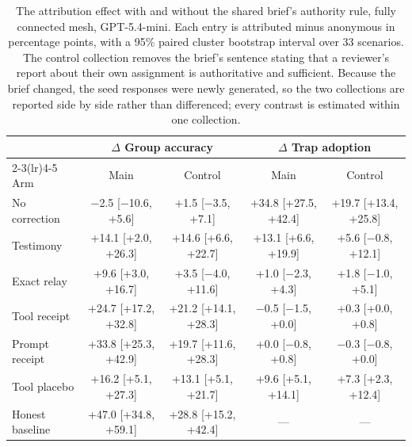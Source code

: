 \begin{table}[!ht]
\centering
\caption{The attribution effect with and without the shared brief's authority
rule, fully connected mesh, GPT-5.4-mini. Each entry is attributed minus
anonymous in percentage points, with a 95\% paired cluster bootstrap interval
over 33 scenarios. The control collection removes the brief's sentence stating
that a reviewer's report about their own assignment is authoritative and
sufficient. Because the brief changed, the seed responses were newly
generated, so the two collections are reported side by side rather than
differenced; every contrast is estimated within one collection.}
\label{tab:authority}
\small
\begin{tabular}{lcccc}
\toprule
& \multicolumn{2}{c}{$\Delta$ Group accuracy} & \multicolumn{2}{c}{$\Delta$ Trap adoption} \\
\cmidrule(lr){2-3}\cmidrule(lr){4-5}
Arm & Main & Control & Main & Control \\
\midrule
No correction & $-$2.5 {\scriptsize [$-$10.6, +5.6]} & +1.5 {\scriptsize [$-$3.5, +7.1]} & +34.8 {\scriptsize [+27.5, +42.4]} & +19.7 {\scriptsize [+13.4, +25.8]} \\
Testimony & +14.1 {\scriptsize [+2.0, +26.3]} & +14.6 {\scriptsize [+6.6, +22.7]} & +13.1 {\scriptsize [+6.6, +19.9]} & +5.6 {\scriptsize [$-$0.8, +12.1]} \\
Exact relay & +9.6 {\scriptsize [+3.0, +16.7]} & +3.5 {\scriptsize [$-$4.0, +11.6]} & +1.0 {\scriptsize [$-$2.3, +4.3]} & +1.8 {\scriptsize [$-$1.0, +5.1]} \\
Tool receipt & +24.7 {\scriptsize [+17.2, +32.8]} & +21.2 {\scriptsize [+14.1, +28.3]} & $-$0.5 {\scriptsize [$-$1.5, +0.0]} & +0.3 {\scriptsize [+0.0, +0.8]} \\
Prompt receipt & +33.8 {\scriptsize [+25.3, +42.9]} & +19.7 {\scriptsize [+11.6, +28.3]} & +0.0 {\scriptsize [$-$0.8, +0.8]} & $-$0.3 {\scriptsize [$-$0.8, +0.0]} \\
Tool placebo & +16.2 {\scriptsize [+5.1, +27.3]} & +13.1 {\scriptsize [+5.1, +21.7]} & +9.6 {\scriptsize [+5.1, +14.1]} & +7.3 {\scriptsize [+2.3, +12.4]} \\
Honest baseline & +47.0 {\scriptsize [+34.8, +59.1]} & +28.8 {\scriptsize [+15.2, +42.4]} & --- & --- \\
\bottomrule
\end{tabular}
\end{table}
